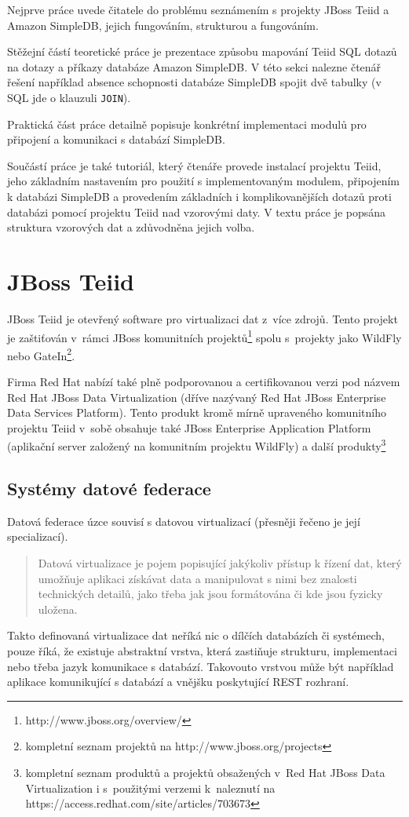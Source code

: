 \documentclass[oneside,12pt]{fithesis2}
\begin{document}
Nejprve práce uvede čitatele do problému seznámením s projekty JBoss Teiid a Amazon SimpleDB, jejich fungováním, strukturou a fungováním.

Stěžejní částí teoretické práce je prezentace způsobu mapování Teiid SQL dotazů na dotazy a příkazy databáze Amazon SimpleDB. V této sekci nalezne čtenář řešení například absence schopnosti databáze SimpleDB spojit dvě tabulky (v SQL jde o klauzuli \texttt{JOIN}).

Praktická část práce detailně popisuje konkrétní implementaci modulů pro připojení a komunikaci s databází SimpleDB. 

Součástí práce je také tutoriál, který čtenáře provede instalací projektu Teiid, jeho základním nastavením pro použití s implementovaným modulem, připojením k databázi SimpleDB a provedením základních i komplikovanějších dotazů proti databázi pomocí projektu Teiid nad vzorovými daty. V textu práce je popsána struktura vzorových dat a zdůvodněna jejich volba.


\chapter{JBoss Teiid}

JBoss Teiid je otevřený software pro virtualizaci dat z~více zdrojů. Tento projekt je zaštiťován v~rámci JBoss komunitních projektů\footnote{http://www.jboss.org/overview/} spolu s~projekty jako WildFly nebo GateIn\footnote{kompletní seznam projektů na http://www.jboss.org/projects}.

Firma Red Hat nabízí také plně podporovanou a certifikovanou verzi pod názvem Red Hat JBoss Data Virtualization (dříve nazývaný Red Hat JBoss Enterprise Data Services Platform). Tento produkt kromě mírně upraveného komunitního projektu Teiid v~sobě obsahuje také JBoss Enterprise Application Platform (aplikační server založený na komunitním projektu WildFly) a další produkty\footnote{kompletní seznam produktů a projektů obsažených v~Red Hat JBoss Data Virtualization i s~použitými verzemi k~naleznutí na https://access.redhat.com/site/articles/703673}

\section{Systémy datové federace}
Datová federace úzce souvisí s datovou virtualizací (přesněji řečeno je její specializací).
\begin{quotation}
 Datová virtualizace je pojem popisující jakýkoliv přístup k řízení dat, který umožňuje aplikaci získávat data a manipulovat s nimi bez znalosti technických detailů, jako třeba jak jsou formátována či kde jsou fyzicky uložena. \cite[volně přeloženo]{virtualizaceDat}
\end{quotation}
Takto definovaná virtualizace dat neříká nic o dílčích databázích či systémech, pouze říká, že existuje abstraktní vrstva, která zastiňuje strukturu, implementaci nebo třeba jazyk komunikace s databází. Takovouto vrstvou může být například aplikace komunikující s databází a vnějšku poskytující REST rozhraní. 
\end{document}
